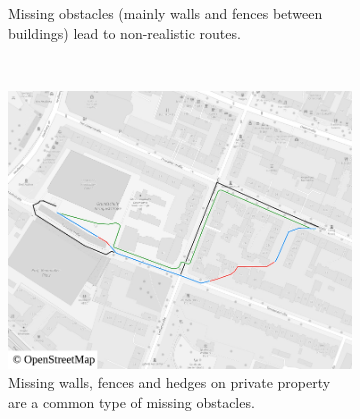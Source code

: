 \begin{figure}[h!]
\begin{minipage}[t]{.48\textwidth}
\begin{subfigure}[t]{\linewidth}
\begin{figcenter}
						\end{figcenter}
						\caption{Missing obstacles (mainly walls and fences between buildings) lead to non-realistic routes.}
						\label{fig:eval-city-usefulness-b}
					\end{subfigure}
				\end{minipage}
				\\[3ex]
				\begin{minipage}[t]{.48\textwidth}
					\begin{subfigure}[t]{\linewidth}
						\begin{figcenter}
							\includegraphics[width=\textwidth]{images/qgis-routing-city-routing-6}
						\end{figcenter}
						\caption{Missing walls, fences and hedges on private property are a common type of missing obstacles.}
						\label{fig:eval-city-usefulness-c}
					\end{subfigure}
				\end{minipage}
				\hfill
				\begin{minipage}[t]{.48\textwidth}
					\begin{subfigure}[t]{\linewidth}
						\begin{figcenter}

\end{figcenter}
\end{subfigure}
\end{minipage}
\end{figure}
